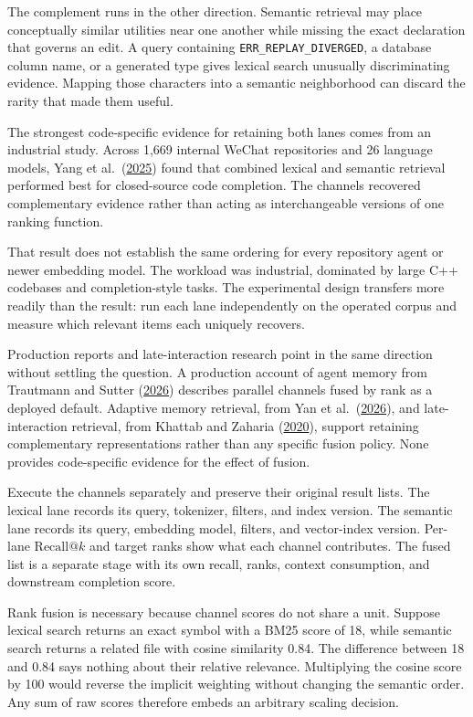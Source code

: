 The complement runs in the other direction. Semantic retrieval may place conceptually similar utilities near one another while missing the exact declaration that governs an edit. A query containing \texttt{ERR\_REPLAY\_DIVERGED}, a database column name, or a generated type gives lexical search unusually discriminating evidence. Mapping those characters into a semantic neighborhood can discard the rarity that made them useful.

The strongest code-specific evidence for retaining both lanes comes from an industrial study. Across 1,669 internal WeChat repositories and 26 language models, Yang et al.~(\href{https://arxiv.org/abs/2507.18515}{2025}) found that combined lexical and semantic retrieval performed best for closed-source code completion. The channels recovered complementary evidence rather than acting as interchangeable versions of one ranking function.

That result does not establish the same ordering for every repository agent or newer embedding model. The workload was industrial, dominated by large C++ codebases and completion-style tasks. The experimental design transfers more readily than the result: run each lane independently on the operated corpus and measure which relevant items each uniquely recovers.

Production reports and late-interaction research point in the same direction without settling the question. A production account of agent memory from Trautmann and Sutter (\href{https://blog.cloudflare.com/introducing-agent-memory/}{2026}) describes parallel channels fused by rank as a deployed default. Adaptive memory retrieval, from Yan et al.~(\href{https://arxiv.org/abs/2603.16496}{2026}), and late-interaction retrieval, from Khattab and Zaharia (\href{https://arxiv.org/abs/2004.12832}{2020}), support retaining complementary representations rather than any specific fusion policy. None provides code-specific evidence for the effect of fusion.

Execute the channels separately and preserve their original result lists. The lexical lane records its query, tokenizer, filters, and index version. The semantic lane records its query, embedding model, filters, and vector-index version. Per-lane \(\mathrm{Recall}@k\) and target ranks show what each channel contributes. The fused list is a separate stage with its own recall, ranks, context consumption, and downstream completion score.

Rank fusion is necessary because channel scores do not share a unit. Suppose lexical search returns an exact symbol with a BM25 score of 18, while semantic search returns a related file with cosine similarity 0.84. The difference between 18 and 0.84 says nothing about their relative relevance. Multiplying the cosine score by 100 would reverse the implicit weighting without changing the semantic order. Any sum of raw scores therefore embeds an arbitrary scaling decision.

